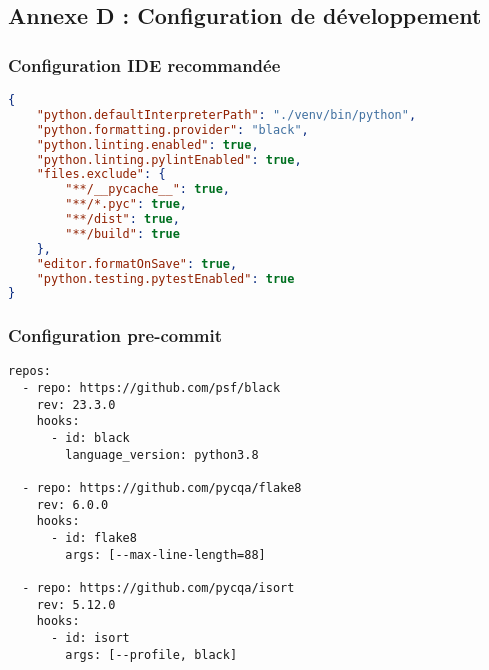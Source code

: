 \documentclass[12pt,a4paper]{article}
\begin{document}
\subsection{Annexe D : Configuration de développement}

\subsubsection{Configuration IDE recommandée}

\begin{codebox}
\begin{lstlisting}[language=json]
{
    "python.defaultInterpreterPath": "./venv/bin/python",
    "python.formatting.provider": "black",
    "python.linting.enabled": true,
    "python.linting.pylintEnabled": true,
    "files.exclude": {
        "**/__pycache__": true,
        "**/*.pyc": true,
        "**/dist": true,
        "**/build": true
    },
    "editor.formatOnSave": true,
    "python.testing.pytestEnabled": true
}
\end{lstlisting}
\end{codebox}

\subsubsection{Configuration pre-commit}

\begin{lstlisting}[caption=.pre-commit-config.yaml]
repos:
  - repo: https://github.com/psf/black
    rev: 23.3.0
    hooks:
      - id: black
        language_version: python3.8
  
  - repo: https://github.com/pycqa/flake8
    rev: 6.0.0
    hooks:
      - id: flake8
        args: [--max-line-length=88]
  
  - repo: https://github.com/pycqa/isort
    rev: 5.12.0
    hooks:
      - id: isort
        args: [--profile, black]
\end{lstlisting}
\end{document}

